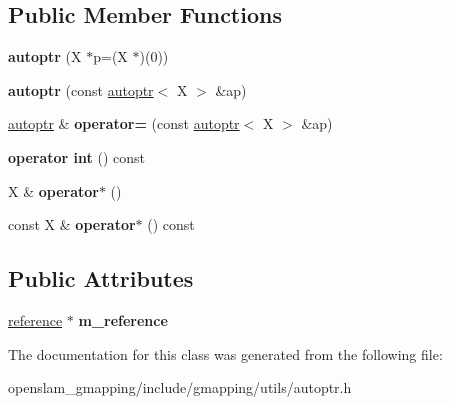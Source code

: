 \subsection*{Public Member Functions}
\begin{DoxyCompactItemize}
\item 
\mbox{\label{classGMapping_1_1autoptr_a881a032985196cd34211b73f2b42e85f}} 
{\bfseries autoptr} (X $\ast$p=(X $\ast$)(0))
\item 
\mbox{\label{classGMapping_1_1autoptr_a138e5689bf690da8c8bb2273d251a263}} 
{\bfseries autoptr} (const \hyperlink{classGMapping_1_1autoptr}{autoptr}$<$ X $>$ \&ap)
\item 
\mbox{\label{classGMapping_1_1autoptr_a7d34a833cda2a53139f00b7b9ed6fa91}} 
\hyperlink{classGMapping_1_1autoptr}{autoptr} \& {\bfseries operator=} (const \hyperlink{classGMapping_1_1autoptr}{autoptr}$<$ X $>$ \&ap)
\item 
\mbox{\label{classGMapping_1_1autoptr_adfd2157bfe4c2322d94dfdc831fc4ba4}} 
{\bfseries operator int} () const
\item 
\mbox{\label{classGMapping_1_1autoptr_a465bd585f4f8e72c0afe9fbbb888035a}} 
X \& {\bfseries operator$\ast$} ()
\item 
\mbox{\label{classGMapping_1_1autoptr_a06051538281923780fde5a64a7eb6dc3}} 
const X \& {\bfseries operator$\ast$} () const
\end{DoxyCompactItemize}
\subsection*{Public Attributes}
\begin{DoxyCompactItemize}
\item 
\mbox{\label{classGMapping_1_1autoptr_aa641f3e33480944c12157ec2dbcfba43}} 
\hyperlink{structGMapping_1_1autoptr_1_1reference}{reference} $\ast$ {\bfseries m\+\_\+reference}
\end{DoxyCompactItemize}


The documentation for this class was generated from the following file\+:\begin{DoxyCompactItemize}
\item 
openslam\+\_\+gmapping/include/gmapping/utils/autoptr.\+h\end{DoxyCompactItemize}
